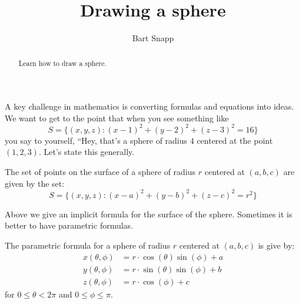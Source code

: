 \documentclass{ximera}
\author{Bart Snapp}
\title[Dig-In:]{Drawing a sphere}
\begin{document}
\begin{abstract}
  Learn how to draw a sphere.
\end{abstract}
\maketitle

A key challenge in mathematics is converting formulas and equations
into ideas. We want to get to the point that when you see something
like
\[
S = \{(x,y,z):(x-1)^2+(y-2)^2+(z-3)^2=16\}
\]
you say to yourself, ``Hey, that's a sphere of radius $4$ centered at
the point $(1,2,3)$. Let's state this generally.
\begin{theorem}
  The set of points on the surface of a sphere of radius $r$ centered
  at $(a,b,c)$ are given by the set:
  \[
  S = \{(x,y,z):(x-a)^2+(y-b)^2+(z-c)^2=r^2\}
  \]
\end{theorem}
Above we give an implicit formula for the surface of the
sphere. Sometimes it is better to have parametric formulas.
\begin{theorem}
  The parametric formula for a sphere of radius $r$ centered at
  $(a,b,c)$ is give by:
  \begin{align*}
    x(\theta,\phi) &=r\cdot\cos(\theta)\sin(\phi)+a\\
    y(\theta,\phi) &=r\cdot\sin(\theta)\sin(\phi)+b\\
    z(\theta,\phi) &=r\cdot\cos(\phi)+c
  \end{align*}
  for $0\le\theta< 2\pi$ and $0\le \phi\le \pi$.
\end{theorem}
\end{document}
